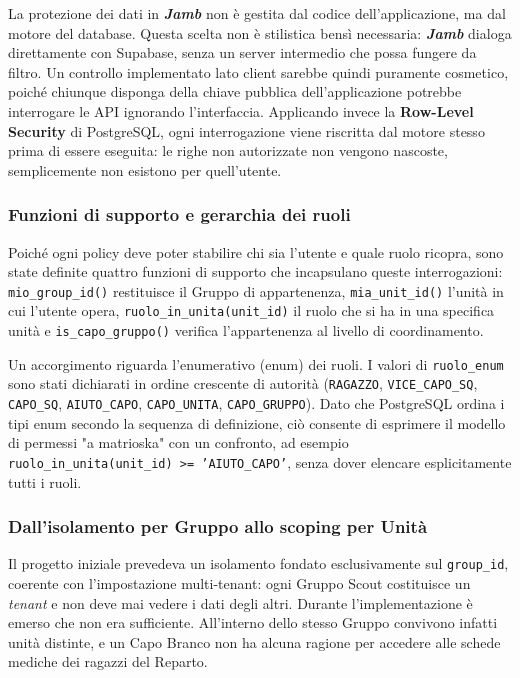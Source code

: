 \documentclass[11pt]{article}
\numberwithin{figure}{section}
\begin{document}
La protezione dei dati in \textbf{\textit{Jamb}} non è gestita dal codice dell'applicazione, ma dal motore del database. Questa scelta non è stilistica bensì necessaria: \textbf{\textit{Jamb}} dialoga direttamente con Supabase, senza un server intermedio che possa fungere da filtro. Un controllo implementato lato client sarebbe quindi puramente cosmetico, poiché chiunque disponga della chiave pubblica dell'applicazione potrebbe interrogare le API ignorando l'interfaccia. Applicando invece la \textbf{Row-Level Security} di PostgreSQL, ogni interrogazione viene riscritta dal motore stesso prima di essere eseguita: le righe non autorizzate non vengono nascoste, semplicemente non esistono per quell'utente.

\subsubsection{Funzioni di supporto e gerarchia dei ruoli}

Poiché ogni policy deve poter stabilire chi sia l'utente e quale ruolo ricopra, sono state definite quattro funzioni di supporto che incapsulano queste interrogazioni: \texttt{mio\_group\_id()} restituisce il Gruppo di appartenenza, \texttt{mia\_unit\_id()} l'unità in cui l'utente opera, \texttt{ruolo\_in\_unita(unit\_id)} il ruolo che si ha in una specifica unità e \texttt{is\_capo\_gruppo()} verifica l'appartenenza al livello di coordinamento.

Un accorgimento riguarda l'enumerativo (enum) dei ruoli. I valori di \texttt{ruolo\_enum} sono stati dichiarati in ordine crescente di autorità (\texttt{RAGAZZO}, \texttt{VICE\_CAPO\_SQ}, \texttt{CAPO\_SQ}, \texttt{AIUTO\_CAPO}, \texttt{CAPO\_UNITA}, \texttt{CAPO\_GRUPPO}). Dato che PostgreSQL ordina i tipi enum secondo la sequenza di definizione, ciò consente di esprimere il modello di permessi "a matrioska" con un confronto, ad esempio \texttt{ruolo\_in\_unita(unit\_id) >= 'AIUTO\_CAPO'}, senza dover elencare esplicitamente tutti i ruoli.

\subsubsection{Dall'isolamento per Gruppo allo scoping per Unità}

Il progetto iniziale prevedeva un isolamento fondato esclusivamente sul \texttt{group\_id}, coerente con l'impostazione multi-tenant: ogni Gruppo Scout costituisce un \textit{tenant} e non deve mai vedere i dati degli altri. Durante l'implementazione è emerso che non era sufficiente. All'interno dello stesso Gruppo convivono infatti unità distinte, e un Capo Branco non ha alcuna ragione per accedere alle schede mediche dei ragazzi del Reparto.
\end{document}
